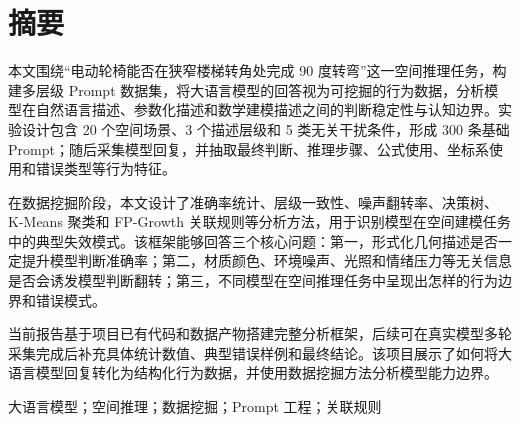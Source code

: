 
\chapter*{\centering \sanhao\song\bfseries 摘\quad 要}

\xiaosi\song
{}

本文围绕“电动轮椅能否在狭窄楼梯转角处完成 90 度转弯”这一空间推理任务，构建多层级 Prompt 数据集，将大语言模型的回答视为可挖掘的行为数据，分析模型在自然语言描述、参数化描述和数学建模描述之间的判断稳定性与认知边界。实验设计包含 20 个空间场景、3 个描述层级和 5 类无关干扰条件，形成 300 条基础 Prompt；随后采集模型回复，并抽取最终判断、推理步骤、公式使用、坐标系使用和错误类型等行为特征。

在数据挖掘阶段，本文设计了准确率统计、层级一致性、噪声翻转率、决策树、K-Means 聚类和 FP-Growth 关联规则等分析方法，用于识别模型在空间建模任务中的典型失效模式。该框架能够回答三个核心问题：第一，形式化几何描述是否一定提升模型判断准确率；第二，材质颜色、环境噪声、光照和情绪压力等无关信息是否会诱发模型判断翻转；第三，不同模型在空间推理任务中呈现出怎样的行为边界和错误模式。

当前报告基于项目已有代码和数据产物搭建完整分析框架，后续可在真实模型多轮采集完成后补充具体统计数值、典型错误样例和最终结论。该项目展示了如何将大语言模型回复转化为结构化行为数据，并使用数据挖掘方法分析模型能力边界。

\vspace{0.8cm}

 大语言模型；空间推理；数据挖掘；Prompt 工程；关联规则

